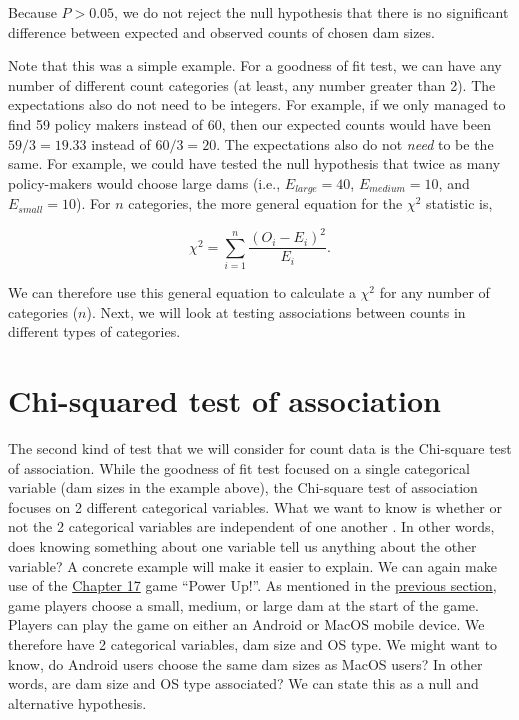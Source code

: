 \documentclass[
  openany]{scrbook}
\begin{document}
Because \(P > 0.05\), we do not reject the null hypothesis that there is no significant difference between expected and observed counts of chosen dam sizes.

Note that this was a simple example.
For a goodness of fit test, we can have any number of different count categories (at least, any number greater than 2).
The expectations also do not need to be integers.
For example, if we only managed to find 59 policy makers instead of 60, then our expected counts would have been \(59/3 = 19.33\) instead of \(60/3 = 20\).
The expectations also do not \emph{need} to be the same.
For example, we could have tested the null hypothesis that twice as many policy-makers would choose large dams (i.e., \(E_{large} = 40\), \(E_{medium} = 10\), and \(E_{small} = 10\)).
For \(n\) categories, the more general equation for the \(\chi^{2}\) statistic is,

\[\chi^{2} = \sum_{i = 1}^{n} \frac{\left(O_{i} - E_{i}\right)^{2}}{E_{i}}.\]

We can therefore use this general equation to calculate a \(\chi^{2}\) for any number of categories (\(n\)).
Next, we will look at testing associations between counts in different types of categories.

\hypertarget{chi-squared-test-of-association}{%
\section{Chi-squared test of association}\label{chi-squared-test-of-association}}

The second kind of test that we will consider for count data is the Chi-square test of association.
While the goodness of fit test focused on a single categorical variable (dam sizes in the example above), the Chi-square test of association focuses on 2 different categorical variables.
What we want to know is whether or not the 2 categorical variables are independent of one another \citep{Box1978}.
In other words, does knowing something about one variable tell us anything about the other variable?
A concrete example will make it easier to explain.
We can again make use of the \protect\hyperlink{Chapter_17}{Chapter 17} game ``Power Up!''.
As mentioned in the \protect\hyperlink{chi-squared-goodness-of-fit}{previous section}, game players choose a small, medium, or large dam at the start of the game.
Players can play the game on either an Android or MacOS mobile device.
We therefore have 2 categorical variables, dam size and OS type.
We might want to know, do Android users choose the same dam sizes as MacOS users?
In other words, are dam size and OS type associated?
We can state this as a null and alternative hypothesis.
\end{document}
